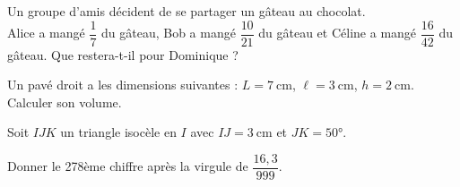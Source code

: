 \documentclass[addpoints,12pt]{exam}
\begin{document}
\begin{questions}

    \question[3]
    Un groupe d'amis décident de se partager un gâteau au chocolat.\\
    Alice a mangé $\dfrac{1}{7}$ du gâteau, Bob a mangé $\dfrac{10}{21}$ du gâteau et Céline a mangé $\dfrac{16}{42}$ du gâteau. Que restera-t-il pour Dominique ?

    \question[2]
        Un pavé droit a les dimensions suivantes : $L = \qty{7}{\centi\metre}$, $\ell = \qty{3}{\centi\metre}$, $h = \qty{2}{\centi\metre}$. \\
        Calculer son volume.

    \question[4]
    Soit $IJK$ un triangle isocèle en $I$ avec $IJ = \qty{3}{\cm}$ et $JK = \ang{50}$.

    \bonusquestion[1] Donner le 278ème chiffre après la virgule de $\dfrac{16,3}{999}$.
\end{questions}
\end{document}
